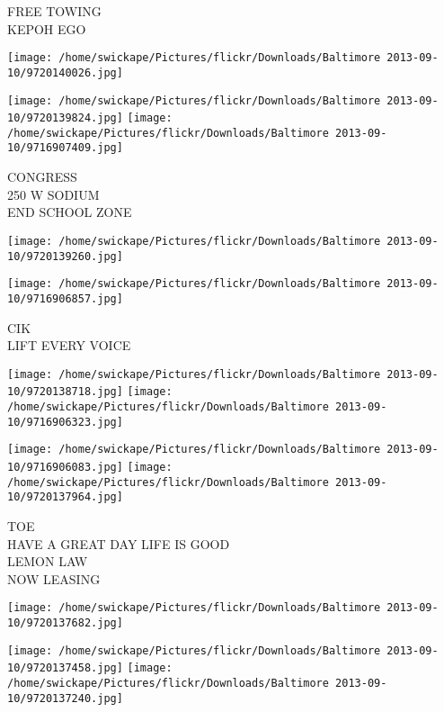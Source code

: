 \documentclass[10pt,letterpaper]{article}
\begin{document}
FREE TOWING\\
KEPOH EGO\\
\pagebreak

\texttt{[image: /home/swickape/Pictures/flickr/Downloads/Baltimore 2013-09-10/9720140026.jpg]}

\vspace{0.25in}
\texttt{[image: /home/swickape/Pictures/flickr/Downloads/Baltimore 2013-09-10/9720139824.jpg]}
\texttt{[image: /home/swickape/Pictures/flickr/Downloads/Baltimore 2013-09-10/9716907409.jpg]}

CONGRESS\\
250 W SODIUM\\
END SCHOOL ZONE\\
\pagebreak

\texttt{[image: /home/swickape/Pictures/flickr/Downloads/Baltimore 2013-09-10/9720139260.jpg]}

\vspace{0.25in}
\texttt{[image: /home/swickape/Pictures/flickr/Downloads/Baltimore 2013-09-10/9716906857.jpg]}

CIK\\
LIFT EVERY VOICE\\
\pagebreak

\texttt{[image: /home/swickape/Pictures/flickr/Downloads/Baltimore 2013-09-10/9720138718.jpg]}
\texttt{[image: /home/swickape/Pictures/flickr/Downloads/Baltimore 2013-09-10/9716906323.jpg]}

\texttt{[image: /home/swickape/Pictures/flickr/Downloads/Baltimore 2013-09-10/9716906083.jpg]}
\texttt{[image: /home/swickape/Pictures/flickr/Downloads/Baltimore 2013-09-10/9720137964.jpg]}

TOE\\
HAVE A GREAT DAY LIFE IS GOOD\\
LEMON LAW\\
NOW LEASING\\
\pagebreak

\texttt{[image: /home/swickape/Pictures/flickr/Downloads/Baltimore 2013-09-10/9720137682.jpg]}

\vspace{0.25in}
\texttt{[image: /home/swickape/Pictures/flickr/Downloads/Baltimore 2013-09-10/9720137458.jpg]}
\texttt{[image: /home/swickape/Pictures/flickr/Downloads/Baltimore 2013-09-10/9720137240.jpg]}
\end{document}

